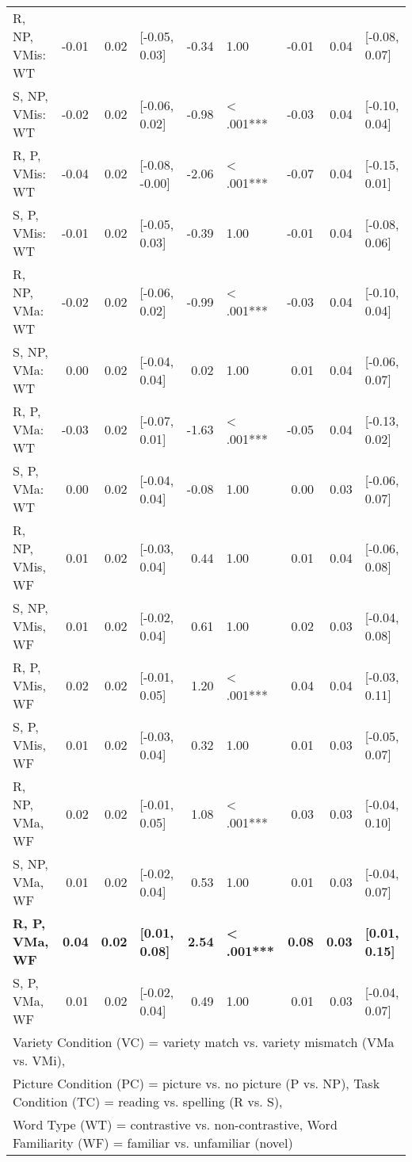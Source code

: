 \documentclass[doc,floatsintext]{apa6}
\begin{document}
\begin{table}[!h]
{\begin{tabular}{lrrlrlrrl}
R, NP, VMis: WT & -0.01 & 0.02 & [-0.05, 0.03] & -0.34 & 1.00 & -0.01 & 0.04 & [-0.08, 0.07]\\
S, NP, VMis: WT & -0.02 & 0.02 & [-0.06, 0.02] & -0.98 & < .001*** & -0.03 & 0.04 & [-0.10, 0.04]\\
R, P, VMis: WT & -0.04 & 0.02 & [-0.08, -0.00] & -2.06 & < .001*** & -0.07 & 0.04 & [-0.15, 0.01]\\
S, P, VMis: WT & -0.01 & 0.02 & [-0.05, 0.03] & -0.39 & 1.00 & -0.01 & 0.04 & [-0.08, 0.06]\\
R, NP, VMa: WT & -0.02 & 0.02 & [-0.06, 0.02] & -0.99 & < .001*** & -0.03 & 0.04 & [-0.10, 0.04]\\
S, NP, VMa: WT & 0.00 & 0.02 & [-0.04, 0.04] & 0.02 & 1.00 & 0.01 & 0.04 & [-0.06, 0.07]\\
R, P, VMa: WT & -0.03 & 0.02 & [-0.07, 0.01] & -1.63 & < .001*** & -0.05 & 0.04 & [-0.13, 0.02]\\
S, P, VMa: WT & 0.00 & 0.02 & [-0.04, 0.04] & -0.08 & 1.00 & 0.00 & 0.03 & [-0.06, 0.07]\\
R, NP, VMis, WF & 0.01 & 0.02 & [-0.03, 0.04] & 0.44 & 1.00 & 0.01 & 0.04 & [-0.06, 0.08]\\
S, NP, VMis, WF & 0.01 & 0.02 & [-0.02, 0.04] & 0.61 & 1.00 & 0.02 & 0.03 & [-0.04, 0.08]\\
R, P, VMis, WF & 0.02 & 0.02 & [-0.01, 0.05] & 1.20 & < .001*** & 0.04 & 0.04 & [-0.03, 0.11]\\
S, P, VMis, WF & 0.01 & 0.02 & [-0.03, 0.04] & 0.32 & 1.00 & 0.01 & 0.03 & [-0.05, 0.07]\\
R, NP, VMa, WF & 0.02 & 0.02 & [-0.01, 0.05] & 1.08 & < .001*** & 0.03 & 0.03 & [-0.04, 0.10]\\
S, NP, VMa, WF & 0.01 & 0.02 & [-0.02, 0.04] & 0.53 & 1.00 & 0.01 & 0.03 & [-0.04, 0.07]\\
\textbf{R, P, VMa, WF} & \textbf{0.04} & \textbf{0.02} & \textbf{[0.01, 0.08]} & \textbf{2.54} & \textbf{< .001***} & \textbf{0.08} & \textbf{0.03} & \textbf{[0.01, 0.15]}\\
S, P, VMa, WF & 0.01 & 0.02 & [-0.02, 0.04] & 0.49 & 1.00 & 0.01 & 0.03 & [-0.04, 0.07]\\
\bottomrule
\multicolumn{9}{l}{Variety Condition (VC) = variety match vs. variety mismatch (VMa vs. VMi),}\\
\multicolumn{9}{l}{Picture Condition (PC) = picture vs. no picture (P vs. NP), Task Condition (TC) = reading vs. spelling (R vs. S),}\\
\multicolumn{9}{l}{Word Type (WT) = contrastive vs. non-contrastive, Word Familiarity (WF) = familiar vs. unfamiliar (novel)}\\
\end{tabular}}
\end{table}
\end{document}
